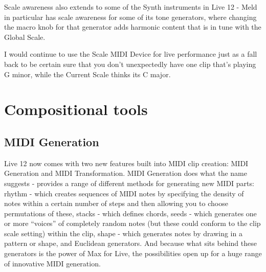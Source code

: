 \documentclass[
  12pt,
  letterpaper,
  oneside,
  open=any]{scrbook}
\begin{document}
Scale awareness also extends to some of the Synth instruments in Live 12
- Meld in particular has scale awareness for some of its tone
generators, where changing the macro knob for that generator adds
harmonic content that is in tune with the Global Scale.

\begin{tcolorbox}[enhanced jigsaw, arc=.35mm, title=\textcolor{quarto-callout-caution-color}{\faFire}\hspace{0.5em}{Continue to use Scale Device in live performance!}, colback=white, opacitybacktitle=0.6, coltitle=black, toptitle=1mm, colframe=quarto-callout-caution-color-frame, bottomtitle=1mm, titlerule=0mm, rightrule=.15mm, bottomrule=.15mm, colbacktitle=quarto-callout-caution-color!10!white, toprule=.15mm, breakable, opacityback=0, left=2mm, leftrule=.75mm]

I would continue to use the Scale MIDI Device for live performance just
as a fall back to be certain sure that you don't unexpectedly have one
clip that's playing G minor, while the Current Scale thinks its C major.

\end{tcolorbox}

\section{Compositional tools}\label{compositional-tools}

\subsection{MIDI Generation}\label{midi-generation}

Live 12 now comes with two new features built into MIDI clip creation:
MIDI Generation and MIDI Transformation. MIDI Generation does what the
name suggests - provides a range of different methods for generating new
MIDI parts: rhythm - which creates sequences of MIDI notes by specifying
the density of notes within a certain number of steps and then allowing
you to choose permutations of these, stacks - which defines chords,
seeds - which generates one or more ``voices'' of completely random
notes (but these could conform to the clip scale setting) within the
clip, shape - which generates notes by drawing in a pattern or shape,
and Euclidean generators. And because what sits behind these generators
is the power of Max for Live, the possibilities open up for a huge range
of innovative MIDI generation.
\end{document}
